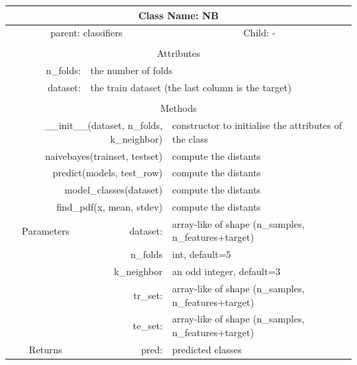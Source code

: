 {\small
\begin{tabular}{llll}
\toprule
\multicolumn{4}{|c|}{Class Name: NB} \\
\midrule
\multicolumn{2}{|c|}{parent: classifiers} &\multicolumn{2}{|c|}{Child: -} \\\bottomrule


\multicolumn{4}{c}{} \\\bottomrule
\multicolumn{4}{|c|}{Attributes} \\\midrule
\multicolumn{1}{|r}{n\_folds: } & \multicolumn{3}{l|}{the number of folds } \\
\multicolumn{1}{|r}{dataset: } & \multicolumn{3}{l|}{the train dataset (the last column is the target) } \\\bottomrule


\multicolumn{4}{c}{} \\\bottomrule
\multicolumn{4}{|c|}{Methods} \\\midrule
\multicolumn{2}{|r}{\_\_init\_\_(dataset, n\_folds, k\_neighbor) } & \multicolumn{2}{l|}{constructor to initialise the attributes of the class} \\
\multicolumn{2}{|r}{naivebayes(trainset, testset) } & \multicolumn{2}{l|}{compute the distants} \\
\multicolumn{2}{|r}{predict(models, test\_row) } & \multicolumn{2}{l|}{compute the distants} \\
\multicolumn{2}{|r}{model\_classes(dataset) } & \multicolumn{2}{l|}{compute the distants} \\
\multicolumn{2}{|r}{find\_pdf(x, mean, stdev) } & \multicolumn{2}{l|}{compute the distants} \\ \midrule


\multicolumn{1}{|c|}{Parameters}
& \multicolumn{1}{|r}{dataset:}& \multicolumn{2}{l|}{array-like of shape (n\_samples, n\_features+target)}\\
\multicolumn{1}{|l|}{} & \multicolumn{1}{|r}{n\_folds}& \multicolumn{2}{l|}{int, default=5}\\
\multicolumn{1}{|l|}{} & \multicolumn{1}{|r}{k\_neighbor}& \multicolumn{2}{l|}{an odd integer, default=3}\\
\multicolumn{1}{|l|}{}& \multicolumn{1}{|r}{tr\_set:}& \multicolumn{2}{l|}{array-like of shape (n\_samples, n\_features+target)}\\
\multicolumn{1}{|l|}{}& \multicolumn{1}{|r}{te\_set:}& \multicolumn{2}{l|}{array-like of shape (n\_samples, n\_features+target)}\\\midrule

\multicolumn{1}{|c|}{Returns} & \multicolumn{1}{|r}{pred:}& \multicolumn{2}{l|}{predicted classes}\\




\bottomrule
\end{tabular}}